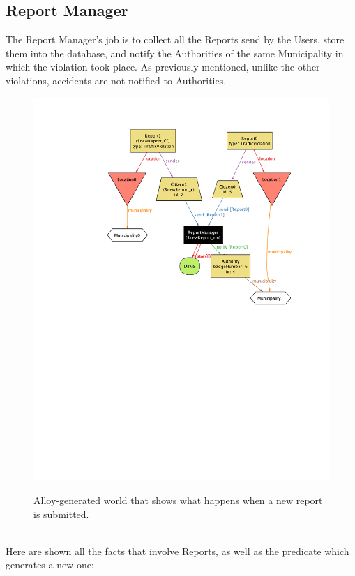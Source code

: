 \documentclass{report}
\begin{document}
\subsection{Report Manager}
The Report Manager's job is to collect all the Reports send by the Users, store them into the database, and notify the Authorities of the same Municipality in which the violation took place. As previously mentioned, unlike the other violations, accidents are not notified to Authorities.
\begin{figure}[ht!]
	\begin{center}
	\includegraphics[width=.7\textwidth]{./img/NewReport.pdf}
	\label{fig:alloyreport}
	\caption{Alloy-generated world that shows what happens when a new report is submitted.}
	\end{center}
\end{figure}\\
Here are shown all the facts that involve Reports, as well as the predicate which generates a new one:\vfill
\end{document}
